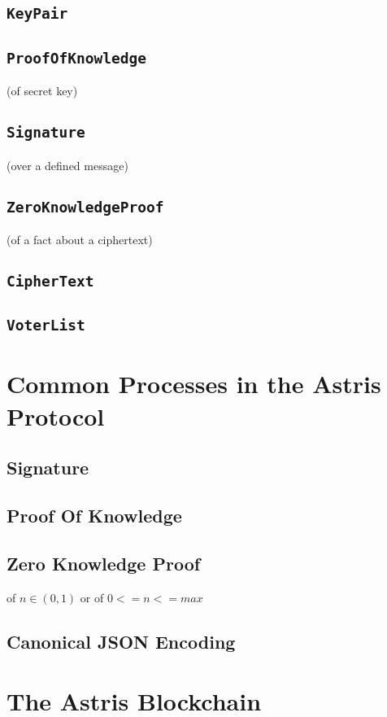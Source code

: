 \section*{\texttt{KeyPair}}
\label{dt:elgamal:keypair}


\section*{\texttt{ProofOfKnowledge}}
\label{dt:elgamal:pok}
(of secret key)

\section*{\texttt{Signature}}
\label{dt:elgamal:sig}
(over a defined message)

\section*{\texttt{ZeroKnowledgeProof}}
\label{dt:elgamal:zkp}
(of a fact about a ciphertext)

\section*{\texttt{CipherText}}
\label{dt:elgamal:ct}

\section*{\texttt{VoterList}}
\label{dt:setup:voterlist}


\chapter{Common Processes in the Astris Protocol}
\label{appendix:processes}

\section*{Signature}
\label{proc:sign}

\section*{Proof Of Knowledge}
\label{proc:pok}

\section*{Zero Knowledge Proof}
\label{proc:zkp}

of $n \in (0,1)$ or of $0 <= n <= max$


\section*{Canonical JSON Encoding}
\label{proc:json}

\chapter{The Astris Blockchain}
\label{appendix:blockchain}